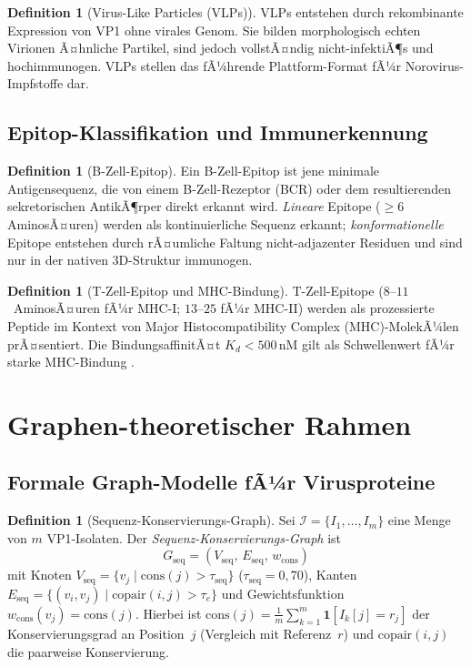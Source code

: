 ﻿\documentclass[a4paper,12pt]{article}
\theoremstyle{plain}
\theoremstyle{definition}
\newtheorem{definition}[satz]{Definition}
\theoremstyle{remark}
\begin{document}
\begin{definition}[Virus-Like Particles (VLPs)]
VLPs entstehen durch rekombinante Expression von VP1 ohne virales Genom. Sie bilden
morphologisch echten Virionen Ã¤hnliche Partikel, sind jedoch vollstÃ¤ndig nicht-infektiÃ¶s
und hochimmunogen. VLPs stellen das fÃ¼hrende Plattform-Format fÃ¼r Norovirus-Impfstoffe dar.
\end{definition}

\subsection{Epitop-Klassifikation und Immunerkennung}

\begin{definition}[B-Zell-Epitop]
Ein B-Zell-Epitop ist jene minimale Antigensequenz, die von einem B-Zell-Rezeptor (BCR)
oder dem resultierenden sekretorischen AntikÃ¶rper direkt erkannt wird.
\textit{Lineare} Epitope ($\geq\!6$ AminosÃ¤uren) werden als kontinuierliche Sequenz erkannt;
\textit{konformationelle} Epitope entstehen durch rÃ¤umliche Faltung nicht-adjazenter Residuen
und sind nur in der nativen 3D-Struktur immunogen.
\end{definition}

\begin{definition}[T-Zell-Epitop und MHC-Bindung]
T-Zell-Epitope ($8$--$11$~AminosÃ¤uren fÃ¼r MHC-I; $13$--$25$ fÃ¼r MHC-II) werden als
prozessierte Peptide im Kontext von Major Histocompatibility Complex (MHC)-MolekÃ¼len
prÃ¤sentiert. Die BindungsaffinitÃ¤t $K_d < 500\,\text{nM}$ gilt als Schwellenwert fÃ¼r
starke MHC-Bindung \citep{netmhc2019}.
\end{definition}

\section{Graphen-theoretischer Rahmen}

\subsection{Formale Graph-Modelle fÃ¼r Virusproteine}

\begin{definition}[Sequenz-Konservierungs-Graph]
Sei $\mathcal{I} = \{I_1,\ldots,I_m\}$ eine Menge von $m$ VP1-Isolaten.
Der \emph{Sequenz-Konservierungs-Graph} ist
\[
  G_{\text{seq}} = (V_{\text{seq}},\, E_{\text{seq}},\, w_{\text{cons}})
\]
mit Knoten $V_{\text{seq}} = \{v_j \mid \text{cons}(j) > \tau_{\text{seq}}\}$
($\tau_{\text{seq}} = 0{,}70$), Kanten
$E_{\text{seq}} = \{(v_i,v_j)\mid \text{copair}(i,j) > \tau_e\}$ und
Gewichtsfunktion $w_{\text{cons}}(v_j) = \text{cons}(j)$.
Hierbei ist $\text{cons}(j) = \frac{1}{m}\sum_{k=1}^m \mathbf{1}[I_k[j] = r_j]$
der Konservierungsgrad an Position~$j$ (Vergleich mit Referenz~$r$) und
$\text{copair}(i,j)$ die paarweise Konservierung.
\end{definition}
\end{document}
